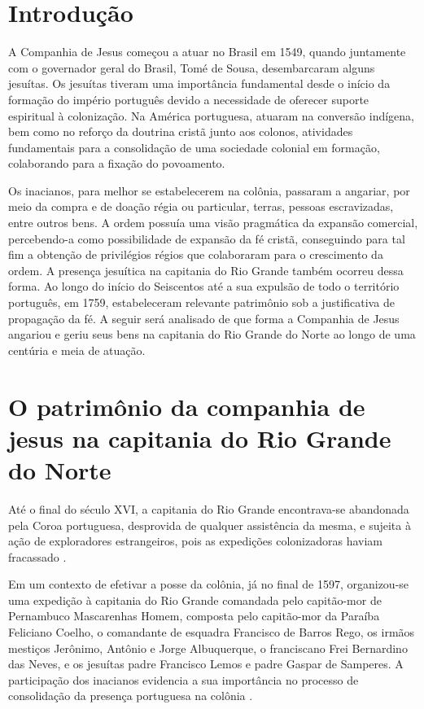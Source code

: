 \flourish





\section{Introdução}
A Companhia de Jesus começou a atuar no Brasil em 1549, quando juntamente com o governador geral do Brasil, Tomé de Sousa, desembarcaram alguns jesuítas. Os jesuítas tiveram uma importância fundamental desde o início da formação do império português devido a necessidade de oferecer suporte espiritual à colonização. Na América portuguesa, atuaram na conversão indígena, bem como no reforço da doutrina cristã junto aos colonos, atividades fundamentais para a consolidação de uma sociedade colonial em formação, colaborando para a fixação do povoamento.  

Os inacianos, para melhor se estabelecerem na colônia, passaram a angariar, por meio da compra e de doação régia ou particular, terras, pessoas escravizadas, entre outros bens. A ordem possuía uma visão pragmática da expansão comercial, percebendo-a como possibilidade de expansão da fé cristã, conseguindo para tal fim a obtenção de privilégios régios que colaboraram para o crescimento da ordem. A presença jesuítica na capitania do Rio Grande também ocorreu dessa forma. Ao longo do início do Seiscentos até a sua expulsão de todo o território português, em 1759, estabeleceram relevante patrimônio sob a justificativa de propagação da fé. A seguir será analisado de que forma a Companhia de Jesus angariou e geriu seus bens na capitania do Rio Grande do Norte ao longo de uma centúria e meia de atuação.  





\section{O patrimônio da companhia de jesus na capitania do Rio Grande do Norte}

Até o final do século XVI, a capitania do Rio Grande encontrava-se abandonada pela Coroa portuguesa, desprovida de qualquer assistência da mesma, e sujeita à ação de exploradores estrangeiros, pois as expedições colonizadoras haviam fracassado
\cites[][p.~200]{Medeiros1985}{Pereira2018}.

Em um contexto de efetivar a posse da colônia, já no final de 1597, organizou-se uma expedição à capitania do Rio Grande comandada pelo capitão-mor de Pernambuco Mascarenhas Homem, composta pelo capitão-mor da Paraíba Feliciano Coelho, o comandante de esquadra Francisco de Barros Rego, os irmãos mestiços Jerônimo, Antônio e Jorge Albuquerque, o franciscano Frei Bernardino das Neves, e os jesuítas padre Francisco Lemos e padre Gaspar de Samperes. A participação dos inacianos evidencia a sua importância no processo de consolidação da presença portuguesa na colônia \cite[p.~34]{MarizAndSuassuna2002}. 

